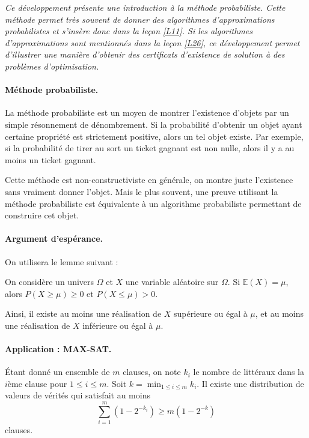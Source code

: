 
\textit{Ce développement présente une introduction à la méthode probabiliste. Cette méthode permet très souvent de donner des algorithmes d'approximations probabilistes et s'insère donc dans la leçon \ref{L11}. Si les algorithmes d'approximations sont mentionnés dans la leçon \ref{L26}, ce développement permet d'illustrer une manière d'obtenir des certificats d'existence de solution à des problèmes d'optimisation.}


\paragraph{Méthode probabiliste.} La méthode probabiliste est un moyen de montrer l'existence d'objets par un simple résonnement de dénombrement. Si la probabilité d'obtenir un objet ayant certaine propriété est strictement positive, alors un tel objet existe. Par exemple, si la probabilité de tirer au sort un ticket gagnant est non nulle, alors il y a au moins un ticket gagnant.

Cette méthode est non-constructiviste en générale, on montre juste l'existence sans vraiment donner l'objet. Mais le plus souvent, une preuve utilisant la méthode probabiliste est équivalente à un algorithme probabiliste permettant de construire cet objet.


\paragraph{Argument d'espérance.}

On utilisera le lemme suivant :
\begin{lemma}
On considère un univers $\Omega$ et $X$ une variable aléatoire sur $\Omega$. Si $\mathbb{E}(X) =\mu$, alors $P(X\geq \mu) \geq 0$ et $P(X\leq \mu)>0$.
\end{lemma}

Ainsi, il existe au moins une réalisation de $X$ supérieure ou égal à $\mu$, et au moins une réalisation de $X$ inférieure ou égal à $\mu$.

\paragraph{Application : MAX-SAT.}

\begin{theorem}
Étant donné un ensemble de $m$ clauses, on note $k_i$ le nombre de littéraux dans la $i$ème clause pour $1\leq i \leq m$. Soit $k = \min_{1\leq i \leq m} k_i$. Il existe une distribution de valeurs de vérités qui satisfait au moins 
$$
\sum_{i=1}^m (1-2^{-k_i}) \geq m(1-2^{-k})
$$
clauses.
\end{theorem}

